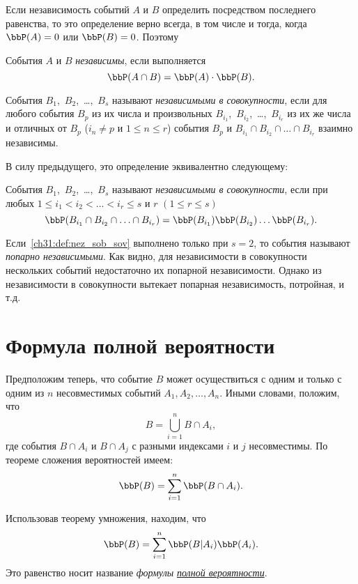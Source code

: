 Если независимость событий $A$ и $B$ определить посредством последнего равенства, то это определение верно всегда, в том числе и тогда, когда $\bbP(A) = 0$ или $\bbP(B) = 0$. Поэтому
\begin{defn}
События $A$ и $B$ \textit{независимы}, если выполняется $$\bbP(A\cap B) = \bbP(A)\cdot \bbP(B).$$
\end{defn}

События $B_1$,~$B_2$,~\dots,~$B_s$ называют \textit{независимыми в совокупности}, если для любого события $B_p$ из их числа и произвольных $B_{i_1}$,~$B_{i_2}$,~\dots,~$B_{i_r}$ из их же числа и отличных от $B_p$  ($i_n \not= p$  и $1 \le n \le r$) события $B_p$ и $B_{i_1}\cap B_{i_2}\cap \dots\cap B_{i_r}$ взаимно независимы.

В силу предыдущего, это определение эквивалентно следующему:
\begin{defn} События $B_1$,~$B_2$,~\dots,~$B_s$ называют \textit{независимыми в совокупности}, если при любых $1 \le i_1 < i_2 < \dots < i_r \le s$ и $r$ $(1 \le r \le s)$
\begin{equation}\label{ch31:def:nez_sob_sov}
\bbP(B_{i_1}\cap B_{i_2}\cap\ldots\cap B_{i_r}) = \bbP(B_{i_1})\bbP(B_{i_2}) \ldots \bbP(B_{i_r}).
\end{equation}
\end{defn}
Если~\eqref{ch31:def:nez_sob_sov} выполнено только при $s=2$, то события называют \textit{попарно независимыми}. Как видно, для независимости в совокупности нескольких событий недостаточно их попарной независимости. Однако из независимости в совокупности вытекает попарная независимость, потройная, и т.д.

\section{Формула полной вероятности}
Предположим теперь, что событие $B$ может осуществиться с одним и только с одним из $n$ несовместимых событий $A_1,A_2, \ldots, A_n$. Иными словами, положим, что
\begin{equation} \label{ch30.2eq5}
B = \bigcup\limits_{i = 1}^{n} B \cap A_i,
\end{equation}
где события $B\cap A_i$ и $B\cap A_j$ с разными индексами $i$ и $j$ несовместимы. По теореме сложения вероятностей имеем:
$$
\bbP(B) = \sum_{i = 1}^{n} \bbP(B\cap A_i).
$$

Использовав теорему умножения, находим, что
\begin{equation}\label{fullprob}
\bbP(B) = \sum_{i = 1}^{n} \bbP(B|A_i)\bbP(A_i).
\end{equation}
Это равенство носит название \textit{формулы} \hyperref[fullprob]{\textit{полной вероятности}}.

